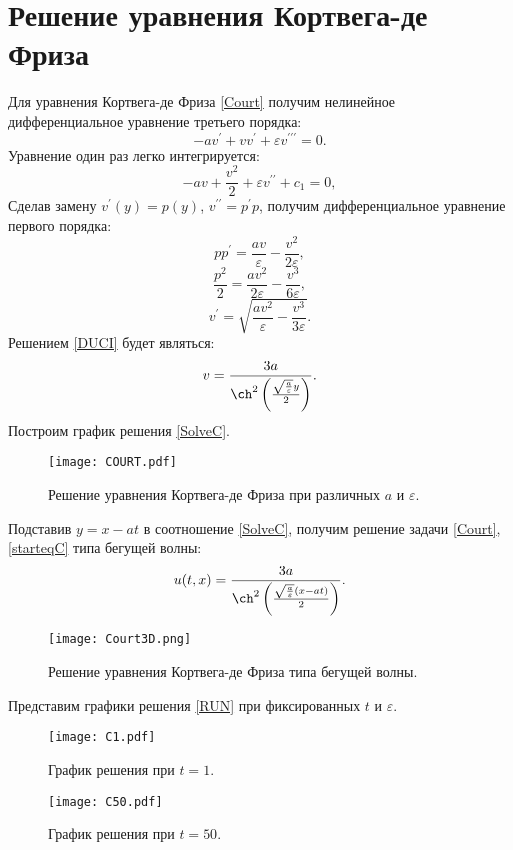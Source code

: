 \documentclass[unicode]{beamer}
\begin{document}
\section{ Решение уравнения Кортвега-де Фриза}
Для уравнения Кортвега-де Фриза \eqref{Court} получим нелинейное дифференциальное уравнение третьего порядка:
\begin{equation} \label{DUC}
-av^\prime+vv^\prime+{\varepsilon}v^{\prime\prime\prime}=0.
\end{equation}
Уравнение один раз легко интегрируется:
\begin{equation} \label{DUC1}
-av+\frac {v^2}{2}+{\varepsilon}v^{\prime\prime}+c_1=0,
\end{equation}
Сделав замену $v^\prime(y)=p(y)$, $v^{\prime\prime}=p^\prime p$, получим дифференциальное уравнение первого порядка:
\begin{equation} \label{DUC2}
pp^\prime=\frac{av}{\varepsilon}-\frac{v^2}{2\varepsilon},
\end{equation}
\[
\frac {p^2}2= \frac{av^2}{2\varepsilon}-\frac{v^3}{6\varepsilon},
\]
\begin{equation} \label{DUCI}
 v^\prime=\sqrt{\frac{av^2}{\varepsilon}-\frac{v^3}{3\varepsilon}}.
\end{equation}
Решением \eqref{DUCI} будет являться:
\begin{equation} \label{SolveC}
v=\frac{3a}{\ch^2\left(\frac {\sqrt{\frac{a}{\varepsilon}}y}{2}\right)}.
\end{equation}
Построим график решения \eqref{SolveC}.
\begin{figure}[H]
\centering
\texttt{[image: COURT.pdf]}
\caption{Решение уравнения Кортвега-де Фриза при различных $a$ и $\varepsilon$.}
\label{ris:imageC2D}
\end{figure}
Подставив  $y=x-at$ в соотношение \eqref{SolveC}, получим решение задачи \eqref{Court}, \eqref{starteqC} типа бегущей волны:
\begin{equation} \label{RUN}
u(t,x)=\frac{3a}{\ch^2\left(\frac{\sqrt{\frac{a}{\varepsilon}}(x-at)}{2}\right)}.
\end{equation}
\begin{figure}[H]
\centering
\texttt{[image: Court3D.png]}
\caption{Решение уравнения Кортвега-де Фриза типа бегущей волны.}
\label{ris:imageC3D}
\end{figure}
Представим графики решения \eqref{RUN} при фиксированных $t$ и $\varepsilon$.
\begin{figure}[H]
\centering
\texttt{[image: C1.pdf]}
\caption{График решения при $t=1$.}
\label{ris:imageCt1}
\end{figure}
\begin{figure}[H]
\centering
\texttt{[image: C50.pdf]}
\caption{График решения при $t=50$.}
\label{ris:imageCt50}
\end{figure}
\end{document}

